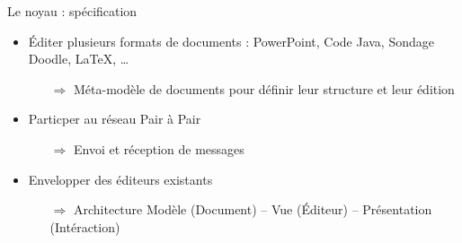 \begin{frame}{Le noyau : spécification}
\begin{itemize}
  \item Éditer plusieurs formats de documents : PowerPoint, Code Java, Sondage
  Doodle, \LaTeX, \ldots 
    \begin{itemize}
    \item[$\Rightarrow$] Méta-modèle de documents pour définir leur structure
    et leur édition
    \end{itemize}
  \item Particper au réseau Pair à Pair
    \begin{itemize}
    \item[$\Rightarrow$] Envoi et réception de messages
    \end{itemize}
  \item Envelopper des éditeurs existants
    \begin{itemize}
    \item[$\Rightarrow$] Architecture Modèle (Document) -- Vue (Éditeur) --
    Présentation (Intéraction)
    \end{itemize}
\end{itemize}
\end{frame}

